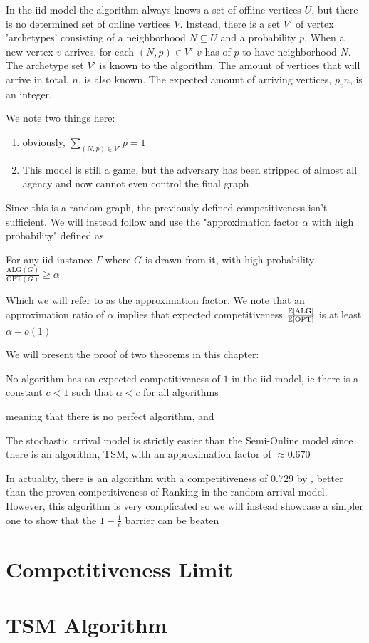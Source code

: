 \begin{definition}
	In the iid model the algorithm always knows a set of offline vertices $U$, but there is no determined set of online vertices $V$. Instead, there is a set $V'$ of vertex 'archetypes' consisting of a neighborhood $N\subseteq U$ and a probability $p$. When a new vertex $v$ arrives, for each $(N,p)\in V'$ $v$ has of $p$ to have neighborhood $N$. The archetype set $V'$ is known to the algorithm. The amount of vertices that will arrive in total, $n$, is also known. The expected amount of arriving vertices, $p_vn$, is an integer.
\end{definition}
We note two things here:
\begin{enumerate}
	\item obviously, $\sum\limits_{(N,p)\in V'}p=1$
	\item This model is still a game, but the adversary has been stripped of almost all agency and now cannot even control the final graph
\end{enumerate}

Since this is a random graph, the previously defined competitiveness isn't sufficient. We will instead follow \cite{obmStochastic} and use the "approximation factor $\alpha$ with high probability" defined as

\begin{definition}
	For any iid instance $\Gamma$ where $G$ is drawn from it, with high probability $\frac{\mathrm{ALG}(G)}{\mathrm{OPT}(G)}\geq\alpha$
\end{definition}

Which we will refer to as the approximation factor. We note that an approximation ratio of $\alpha$ implies that expected competitiveness $\frac{\mathbb{E}[\mathrm{ALG}]}{\mathbb{E}[\mathrm{OPT}]}$ is at least $\alpha-o(1)$

We will present the proof of two theorems in this chapter:

\begin{theorem}
	No algorithm has an expected competitiveness of $1$ in the iid model, ie there is a constant $c<1$ such that $\alpha<c$ for all algorithms
\end{theorem}
meaning that there is no perfect algorithm, and
\begin{theorem}
	\label{thm:sa-alg}
	The stochastic arrival model is strictly easier than the Semi-Online model since there is an algorithm, TSM, with an approximation factor of $\approx 0.670$
\end{theorem}
In actuality, there is an algorithm with a competitiveness of $0.729$ by \cite{obmStochasticBest}, better than the proven competitiveness of Ranking in the random arrival model. However, this algorithm is very complicated so we will instead showcase a simpler one to show that the $1-\frac{1}{e}$ barrier can be beaten

\section{Competitiveness Limit}


\section{TSM Algorithm}
